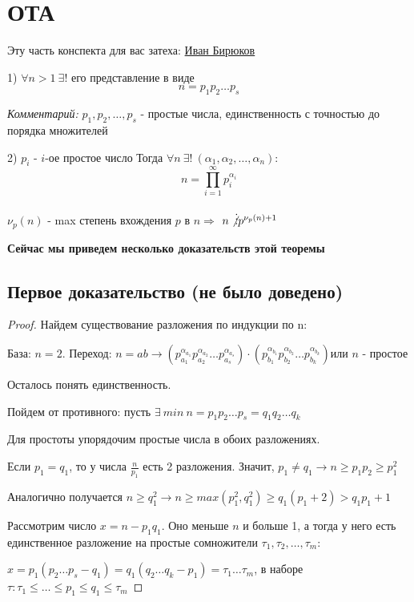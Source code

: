
\section{ОТА}

Эту часть конспекта для вас затеха: \href{\ivanbir}{Иван Бирюков}

\begin{theorem}
  \item[1)]$\forall n > 1 \  \exists!$ его представление в виде $$n = p_1 p_2 \dots p_s$$

  \textit{Комментарий:} $p_1, p_2, \dots, p_s$ - простые числа, единственность с точностью до порядка множителей
  \item[2)] $p_i$ - $i$-ое простое число
  Тогда $\forall n \ \exists! \ (\alpha_1, \alpha_2, \dots, \alpha_n)$:
    $$n = \prod_{i = 1}^{\infty} p_i ^ {\alpha_i}$$
\end{theorem}


\begin{corollary}
  $\nu_p(n)$ - max степень вхождения $p$ в $n \Longrightarrow$
  $n \not \vdots p^{\nu_p(n) + 1}$
\end{corollary}

\textbf{Сейчас мы приведем несколько доказательств этой теоремы}

\subsection{Первое доказательство (не было доведено)}
\begin{proof}
  Найдем существование разложения по индукции по n:

База: $n = 2$. Переход: $n = ab \rightarrow \left(p_{a_1}^{\alpha_{a_1}} p_{a_2}^{\alpha_{a_2}} \dots p_{a_s}^{\alpha_{a_s}}\right) \cdot \left(p_{b_1}^{\alpha_{b_1}} p_{b_2}^{\alpha_{b_2}} \dots p_{b_k}^{\alpha_{b_k}}\right) \text{или $n$ - простое} $

Осталось понять единственность.

Пойдем от противного: пусть $\exists \ min \ n = p_1 p_2 \dots p_s = q_1 q_2 \dots q_k$

Для простоты упорядочим простые числа в обоих разложениях.

Если $p_1 = q_1$, то у числа $\frac{n}{p_1}$ есть 2 разложения. Значит, $p_1 \ne q_1 \to n \geq p_1 p_2 \geq p_1^2$

Аналогично получается $n \ge q_1^2 \rightarrow n \ge max(p_1^2, q_1^2) \ge q_1(p_1 + 2) > q_1p_1 + 1$

Рассмотрим число $x = n - p_1 q_1$. Оно меньше $n$ и больше 1, а тогда у него есть единственное разложение на простые сомножители $\tau_1, \tau_2, \dots, \tau_m$:

$x = p_1(p_2\dots p_s - q_1) = q_1(q_2 \dots q_k - p_1) = \tau_1 \dots \tau_m$, в наборе $\tau: \tau_1 \le \dots \le p_1 \le q_1 \le \tau_m$
\end{proof}

